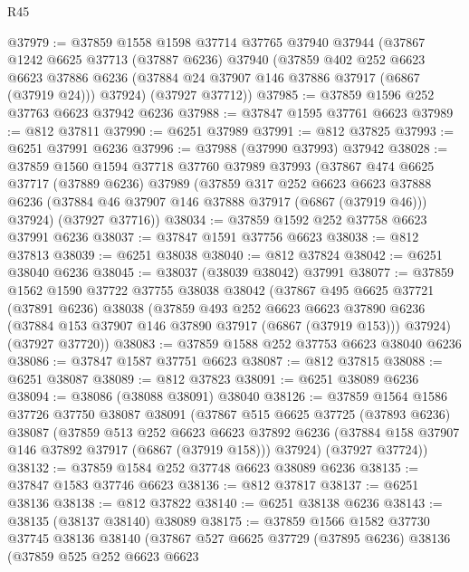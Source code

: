 \begin{lexlean}{R45}
\begin{coremodule}
{@37979 := @37859
    @1558
    @1598
    @37714
    @37765
    @37940
    @37944
    (@37867
      @1242
      @6625
      @37713
      (@37887 @6236)
      @37940
      (@37859
        @402
        @252
        @6623
        @6623
        @37886
        @6236
        (@37884 @24 @37907 @146 @37886 @37917 (@6867 (@37919 @24)))
        @37924)
      (@37927 @37712))
@37985 := @37859 @1596 @252 @37763 @6623 @37942 @6236
@37988 := @37847 @1595 @37761 @6623
@37989 := @812 @37811
@37990 := @6251 @37989
@37991 := @812 @37825
@37993 := @6251 @37991 @6236
@37996 := @37988 (@37990 @37993) @37942
@38028 := @37859
    @1560
    @1594
    @37718
    @37760
    @37989
    @37993
    (@37867
      @474
      @6625
      @37717
      (@37889 @6236)
      @37989
      (@37859
        @317
        @252
        @6623
        @6623
        @37888
        @6236
        (@37884 @46 @37907 @146 @37888 @37917 (@6867 (@37919 @46)))
        @37924)
      (@37927 @37716))
@38034 := @37859 @1592 @252 @37758 @6623 @37991 @6236
@38037 := @37847 @1591 @37756 @6623
@38038 := @812 @37813
@38039 := @6251 @38038
@38040 := @812 @37824
@38042 := @6251 @38040 @6236
@38045 := @38037 (@38039 @38042) @37991
@38077 := @37859
    @1562
    @1590
    @37722
    @37755
    @38038
    @38042
    (@37867
      @495
      @6625
      @37721
      (@37891 @6236)
      @38038
      (@37859
        @493
        @252
        @6623
        @6623
        @37890
        @6236
        (@37884 @153 @37907 @146 @37890 @37917 (@6867 (@37919 @153)))
        @37924)
      (@37927 @37720))
@38083 := @37859 @1588 @252 @37753 @6623 @38040 @6236
@38086 := @37847 @1587 @37751 @6623
@38087 := @812 @37815
@38088 := @6251 @38087
@38089 := @812 @37823
@38091 := @6251 @38089 @6236
@38094 := @38086 (@38088 @38091) @38040
@38126 := @37859
    @1564
    @1586
    @37726
    @37750
    @38087
    @38091
    (@37867
      @515
      @6625
      @37725
      (@37893 @6236)
      @38087
      (@37859
        @513
        @252
        @6623
        @6623
        @37892
        @6236
        (@37884 @158 @37907 @146 @37892 @37917 (@6867 (@37919 @158)))
        @37924)
      (@37927 @37724))
@38132 := @37859 @1584 @252 @37748 @6623 @38089 @6236
@38135 := @37847 @1583 @37746 @6623
@38136 := @812 @37817
@38137 := @6251 @38136
@38138 := @812 @37822
@38140 := @6251 @38138 @6236
@38143 := @38135 (@38137 @38140) @38089
@38175 := @37859
    @1566
    @1582
    @37730
    @37745
    @38136
    @38140
    (@37867
      @527
      @6625
      @37729
      (@37895 @6236)
      @38136
      (@37859
        @525
        @252
        @6623
        @6623
}
\end{coremodule}
\end{lexlean}
